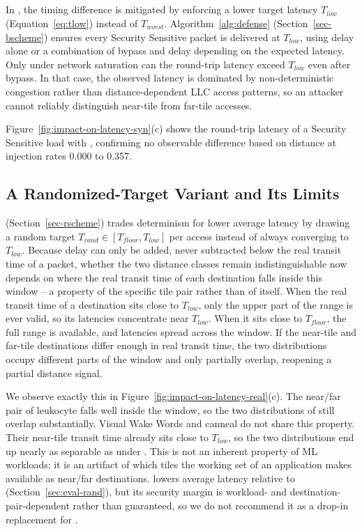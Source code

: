 \subsection{\bscheme} \label{sec-security-bscheme}
In \bscheme{}, the timing difference is mitigated by enforcing a lower target latency $T_{low}$ (Equation~\ref{eq:tlow}) instead of $T_{worst}$.
Algorithm~\ref{alg:defense} (Section~\ref{sec-bscheme}) ensures every Security Sensitive packet is delivered at $T_{low}$, using delay alone or a combination of bypass and delay depending on the expected latency.
Only under network saturation can the round-trip latency exceed $T_{low}$ even after bypass.
In that case, the observed latency is dominated by non-deterministic congestion rather than distance-dependent LLC access patterns, so an attacker cannot reliably distinguish near-tile from far-tile accesses.

Figure~\ref{fig:impact-on-latency-syn}(c) shows the round-trip latency of a Security Sensitive load with \bscheme{}, confirming no observable difference based on distance at injection rates 0.000 to 0.357.

\subsection{A Randomized-Target Variant and Its Limits} \label{sec-security-rand}
\rscheme{} (Section~\ref{sec-rscheme}) trades determinism for lower average latency by drawing a random target $T_{rand} \in [T_{floor}, T_{low}]$ per access instead of always converging to $T_{low}$.
Because delay can only be added, never subtracted below the real transit time of a packet, whether the two distance classes remain indistinguishable now depends on where the real transit time of each destination falls inside this window -- a property of the specific tile pair rather than of \rscheme{} itself.
When the real transit time of a destination sits close to $T_{low}$, only the upper part of the range is ever valid, so its latencies concentrate near $T_{low}$.
When it sits close to $T_{floor}$, the full range is available, and latencies spread across the window.
If the near-tile and far-tile destinations differ enough in real transit time, the two distributions occupy different parts of the window and only partially overlap, reopening a partial distance signal.

We observe exactly this in Figure~\ref{fig:impact-on-latency-real}(c).
The near/far pair of leukocyte falls well inside the window, so the two distributions of \rscheme{} still overlap substantially.
Visual Wake Words and canneal do not share this property. 
Their near-tile transit time already sits close to $T_{low}$, so the two distributions end up nearly as separable as under \basebscheme{}.
This is not an inherent property of ML workloads; it is an artifact of which tiles the working set of an application makes available as near/far destinations.
\rscheme{} lowers average latency relative to \bscheme{} (Section~\ref{sec:eval-rand}), but its security margin is workload- and destination-pair-dependent rather than guaranteed, so we do not recommend it as a drop-in replacement for \bscheme{}.

